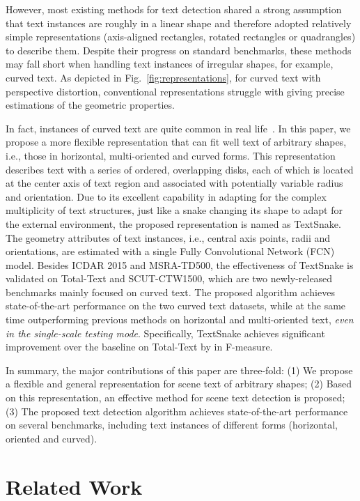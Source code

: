 \documentclass[runningheads]{llncs}
\begin{document}
However, most existing methods for text detection shared a strong assumption that text instances are roughly in a linear shape and therefore adopted relatively simple representations (axis-aligned rectangles, rotated rectangles or quadrangles) to describe them. Despite their progress on standard benchmarks, these methods may fall short when handling text instances of irregular shapes, for example, curved text. As depicted in Fig.~\ref{fig:representations}, for curved text with perspective distortion, conventional representations struggle with giving precise estimations of the geometric properties.

In fact, instances of curved text are quite common in real life~\cite{kheng2017total,Yuliang2017Detecting}. In this paper, we propose a more flexible representation that can fit well text of arbitrary shapes, i.e., those in horizontal, multi-oriented and curved forms. This representation describes text with a series of ordered, overlapping disks, each of which is located at the center axis of text region and associated with potentially variable radius and orientation. Due to its excellent capability in adapting for the complex multiplicity of text structures, just like a snake changing its shape to adapt for the external environment, the proposed representation is named as TextSnake. The geometry attributes of text instances, i.e., central axis points, radii and orientations, are estimated with a single Fully Convolutional Network (FCN) model. Besides ICDAR 2015 and MSRA-TD500, the effectiveness of TextSnake is validated on Total-Text and SCUT-CTW1500, which are two newly-released benchmarks mainly focused on curved text. The proposed algorithm achieves state-of-the-art performance on the two curved text datasets, while at the same time outperforming previous methods on horizontal and multi-oriented text, \textit{even in the single-scale testing mode}. Specifically, TextSnake achieves significant improvement over the baseline on Total-Text by \textit{} in F-measure.

In summary, the major contributions of this paper are three-fold: (1) We propose a flexible and general representation for scene text of arbitrary shapes; (2) Based on this representation, an effective method for scene text detection is proposed; (3) The proposed text detection algorithm achieves state-of-the-art performance on several benchmarks, including text instances of different forms (horizontal, oriented and curved).

\section{Related Work}
\end{document}
